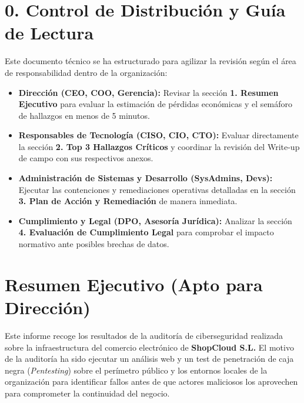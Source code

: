 \documentclass[11pt,a4paper]{report}
\begin{document}
\chapter*{0. Control de Distribución y Guía de Lectura}

Este documento técnico se ha estructurado para agilizar la revisión según el área de responsabilidad dentro de la organización:

\begin{itemize}
    \item \textbf{Dirección (CEO, COO, Gerencia):} Revisar la sección \textbf{1. Resumen Ejecutivo} para evaluar la estimación de pérdidas económicas y el semáforo de hallazgos en menos de 5 minutos.
    \item \textbf{Responsables de Tecnología (CISO, CIO, CTO):} Evaluar directamente la sección \textbf{2. Top 3 Hallazgos Críticos} y coordinar la revisión del Write-up de campo con sus respectivos anexos.
    \item \textbf{Administración de Sistemas y Desarrollo (SysAdmins, Devs):} Ejecutar las contenciones y remediaciones operativas detalladas en la sección \textbf{3. Plan de Acción y Remediación} de manera inmediata.
    \item \textbf{Cumplimiento y Legal (DPO, Asesoría Jurídica):} Analizar la sección \textbf{4. Evaluación de Cumplimiento Legal} para comprobar el impacto normativo ante posibles brechas de datos.
\end{itemize}

\newpage

\chapter{Resumen Ejecutivo (Apto para Dirección)}

Este informe recoge los resultados de la auditoría de ciberseguridad realizada sobre la infraestructura del comercio electrónico de \textbf{ShopCloud S.L.} El motivo de la auditoría ha sido ejecutar un análisis web y un test de penetración de caja negra (\textit{Pentesting}) sobre el perímetro público y los entornos locales de la organización para identificar fallos antes de que actores maliciosos los aprovechen para comprometer la continuidad del negocio.
\end{document}
